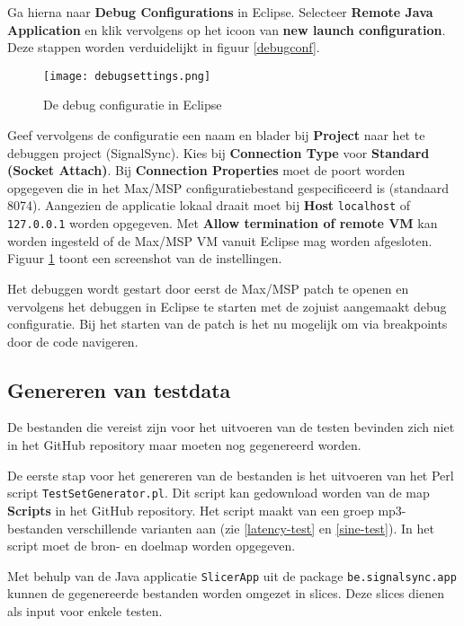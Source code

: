 Ga hierna naar \textbf{Debug Configurations} in Eclipse. Selecteer \textbf{Remote Java Application} en klik vervolgens op het icoon van \textbf{new launch configuration}. Deze stappen worden verduidelijkt in figuur \ref{debugconf}.

\begin{figure}[!tbph]
	\captionsetup{width=0.7\textwidth}
	\caption{De debug configuratie in Eclipse}
	\begin{center}
		\advance\parskip0.3cm
		\texttt{[image: debugsettings.png]}
	\end{center}
	
	\label{debugsettings}
\end{figure}

Geef vervolgens de configuratie een naam en blader bij \textbf{Project} naar het te debuggen project (SignalSync). Kies bij \textbf{Connection Type} voor \textbf{Standard (Socket Attach)}. Bij \textbf{Connection Properties} moet de poort worden opgegeven die in het Max/MSP configuratiebestand gespecificeerd is (standaard 8074). Aangezien de applicatie lokaal draait moet bij \textbf{Host} \texttt{localhost} of \texttt{127.0.0.1} worden opgegeven. Met \textbf{Allow termination of remote VM} kan worden ingesteld of de Max/MSP VM vanuit Eclipse mag worden afgesloten. Figuur \ref{debugsettings} toont een screenshot van de instellingen.

Het debuggen wordt gestart door eerst de Max/MSP patch te openen en vervolgens het debuggen in Eclipse te starten met de zojuist aangemaakt debug configuratie. Bij het starten van de patch is het nu mogelijk om via breakpoints door de code navigeren.

\subsection*{Genereren van testdata}

De bestanden die vereist zijn voor het uitvoeren van de testen bevinden zich niet in het GitHub repository maar moeten nog gegenereerd worden. 

De eerste stap voor het genereren van de bestanden is het uitvoeren van het Perl script \texttt{TestSetGenerator.pl}. Dit script kan gedownload worden van de map \textbf{Scripts} in het GitHub repository. Het script maakt van een groep mp3-bestanden verschillende varianten aan (zie \ref{latency-test} en \ref{sine-test}). In het script moet de bron- en doelmap worden opgegeven.

Met behulp van de Java applicatie \texttt{SlicerApp} uit de package \texttt{be.signalsync.app} kunnen de gegenereerde bestanden worden omgezet in slices. Deze slices dienen als input voor enkele testen.


